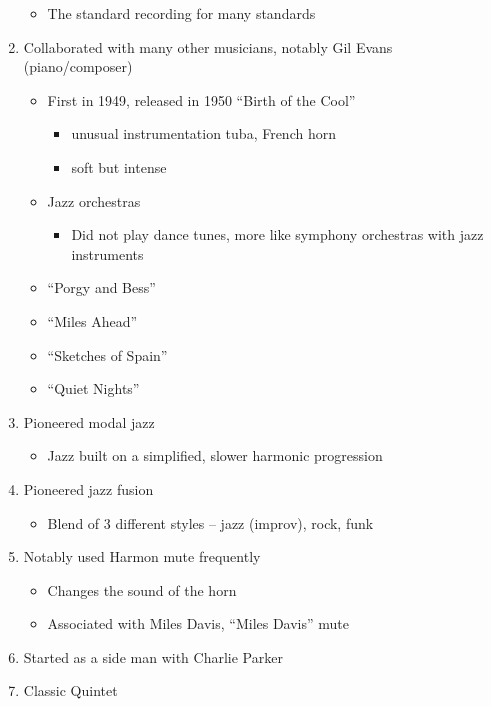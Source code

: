 \documentclass[]{article}
\providecommand{\tightlist}{%
  \setlength{\itemsep}{0pt}\setlength{\parskip}{0pt}}
\begin{document}
\begin{enumerate}
  \begin{itemize}
  \tightlist
  \item
    The standard recording for many standards
  \end{itemize}
\item
  Collaborated with many other musicians, notably Gil Evans
  (piano/composer)

  \begin{itemize}
  \tightlist
  \item
    First in 1949, released in 1950 ``Birth of the Cool''

    \begin{itemize}
    \tightlist
    \item
      unusual instrumentation tuba, French horn
    \item
      soft but intense
    \end{itemize}
  \item
    Jazz orchestras

    \begin{itemize}
    \tightlist
    \item
      Did not play dance tunes, more like symphony orchestras with jazz
      instruments
    \end{itemize}
  \item
    ``Porgy and Bess''
  \item
    ``Miles Ahead''
  \item
    ``Sketches of Spain''
  \item
    ``Quiet Nights''
  \end{itemize}
\item
  Pioneered modal jazz

  \begin{itemize}
  \tightlist
  \item
    Jazz built on a simplified, slower harmonic progression
  \end{itemize}
\item
  Pioneered jazz fusion

  \begin{itemize}
  \tightlist
  \item
    Blend of 3 different styles -- jazz (improv), rock, funk
  \end{itemize}
\item
  Notably used Harmon mute frequently

  \begin{itemize}
  \tightlist
  \item
    Changes the sound of the horn
  \item
    Associated with Miles Davis, ``Miles Davis'' mute
  \end{itemize}
\item
  Started as a side man with Charlie Parker
\item
  Classic Quintet


\end{enumerate}
\end{document}
